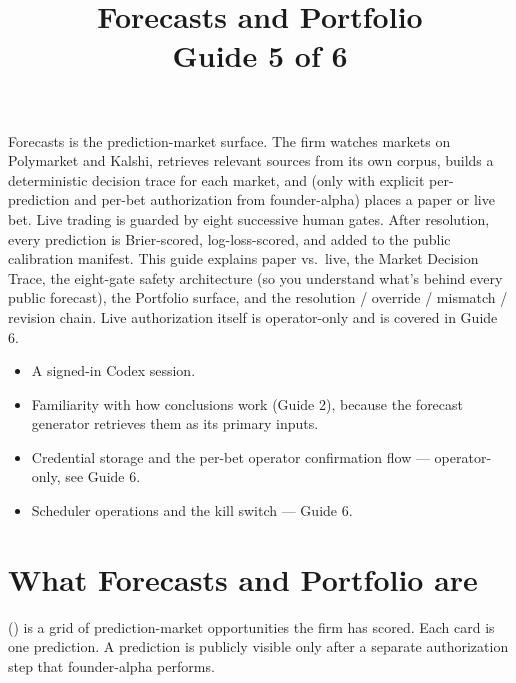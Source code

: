 \documentclass[11pt]{article}
\title{\sffamily\bfseries Forecasts and Portfolio\\[2pt]\large Guide 5 of 6}
\date{}
\author{}
\begin{document}
\maketitle
\thispagestyle{empty}

\begin{tldr}
Forecasts is the prediction-market surface. The firm watches markets
on Polymarket and Kalshi, retrieves relevant sources from its own
corpus, builds a deterministic decision trace for each market, and
(only with explicit per-prediction and per-bet authorization from
founder-alpha) places a paper or live bet. Live trading is guarded by
eight successive human gates. After resolution, every prediction is
Brier-scored, log-loss-scored, and added to the public calibration
manifest. This guide explains paper vs.\ live, the Market Decision
Trace, the eight-gate safety architecture (so you understand what's
behind every public forecast), the Portfolio surface, and the
resolution / override / mismatch / revision chain. Live authorization
itself is operator-only and is covered in Guide 6.
\end{tldr}

\begin{youwillneed}
\begin{itemize}[leftmargin=*,itemsep=0.2em,topsep=0.2em]
  \item A signed-in Codex session.
  \item Familiarity with how conclusions work (Guide 2), because the
        forecast generator retrieves them as its primary inputs.
\end{itemize}
\end{youwillneed}

\begin{notcovered}
\begin{itemize}[leftmargin=*,itemsep=0.2em,topsep=0.2em]
  \item Credential storage and the per-bet operator confirmation flow
        --- operator-only, see Guide 6.
  \item Scheduler operations and the kill switch --- Guide 6.
\end{itemize}
\end{notcovered}

\section{What Forecasts and Portfolio are}

 () is a grid of prediction-market
opportunities the firm has scored. Each card is one prediction. A
prediction is publicly visible only after a separate authorization
step that founder-alpha performs.
\end{document}
